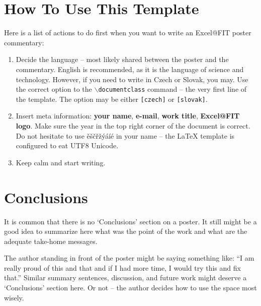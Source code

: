 \documentclass{ExcelAtFIT}
\begin{document}
\section{How To Use This Template}
\label{sec:HowToUse}

Here is a list of actions to do first when you want to write an Excel@FIT poster commentary:
\begin{enumerate}
	\item Decide the language -- most likely shared between the poster and the commentary.  English is recommended, as it is the language of science and technology.  However, if you need to write in Czech or Slovak, you may.  Use the correct option to the \texttt{$\backslash$documentclass} command -- the very first line of the template.  The option may be either \texttt{[czech]} or \texttt{[slovak]}.
	\item Insert meta information: \textbf{your name}, \textbf{e-mail}, \textbf{work title}, \textbf{Excel@FIT logo}.  Make sure the year in the top right corner of the document is correct.  Do not hesitate to use ěščřžýáíé in your name -- the \LaTeX{} template is configured to eat UTF8 Unicode.
	\item Keep calm and start writing.
\end{enumerate}


\section{Conclusions}
\label{sec:Conclusions}

It is common that there is no `Conclusions' section on a poster.  It still might be a good idea to summarize here what was the point of the work and what are the adequate take-home messages.  

The author standing in front of the poster might be saying something like: ``I am really proud of this and that and if I had more time, I would try this and fix that.''  Similar summary sentences, discussion, and future work might deserve a `Conclusions' section here. Or not -- the author decides how to use the space most wisely.
\end{document}
